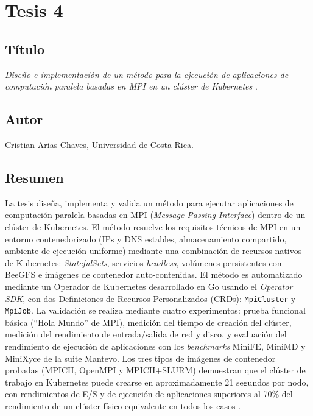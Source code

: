 \section{Tesis 4}

\subsection{Título}
\textit{Diseño e implementación de un método para la ejecución de aplicaciones de computación paralela basadas en MPI en un clúster de Kubernetes} \cite{arias2024}.

\subsection{Autor}
Cristian Arias Chaves, Universidad de Costa Rica.

\subsection{Resumen}
La tesis diseña, implementa y valida un método para ejecutar aplicaciones de computación paralela basadas en MPI (\textit{Message Passing Interface}) dentro de un clúster de Kubernetes. El método resuelve los requisitos técnicos de MPI en un entorno contenedorizado (IPs y DNS estables, almacenamiento compartido, ambiente de ejecución uniforme) mediante una combinación de recursos nativos de Kubernetes: \textit{StatefulSets}, servicios \textit{headless}, volúmenes persistentes con BeeGFS e imágenes de contenedor auto-contenidas. El método es automatizado mediante un Operador de Kubernetes desarrollado en Go usando el \textit{Operator SDK}, con dos Definiciones de Recursos Personalizados (CRDs): \texttt{MpiCluster} y \texttt{MpiJob}. La validación se realiza mediante cuatro experimentos: prueba funcional básica (``Hola Mundo'' de MPI), medición del tiempo de creación del clúster, medición del rendimiento de entrada/salida de red y disco, y evaluación del rendimiento de ejecución de aplicaciones con los \textit{benchmarks} MiniFE, MiniMD y MiniXyce de la suite Mantevo. Los tres tipos de imágenes de contenedor probadas (MPICH, OpenMPI y MPICH+SLURM) demuestran que el clúster de trabajo en Kubernetes puede crearse en aproximadamente 21 segundos por nodo, con rendimientos de E/S y de ejecución de aplicaciones superiores al 70\% del rendimiento de un clúster físico equivalente en todos los casos \cite{arias2024}.


